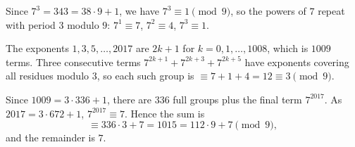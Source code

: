 Since $7^3=343=38\cdot9+1$, we have $7^3\equiv1\pmod9$, so the powers of $7$ repeat with period $3$ modulo $9$: $7^1\equiv7$, $7^2\equiv4$, $7^3\equiv1$.

The exponents $1,3,5,\dots,2017$ are $2k+1$ for $k=0,1,\dots,1008$, which is $1009$ terms. Three consecutive terms $7^{2k+1}+7^{2k+3}+7^{2k+5}$ have exponents covering all residues modulo $3$, so each such group is $\equiv7+1+4=12\equiv3\pmod9$.

Since $1009=3\cdot336+1$, there are $336$ full groups plus the final term $7^{2017}$. As $2017=3\cdot672+1$, $7^{2017}\equiv7$. Hence the sum is
\[
\equiv336\cdot3+7=1015=112\cdot9+7\pmod9,
\]
and the remainder is $\boxed{7}$.
